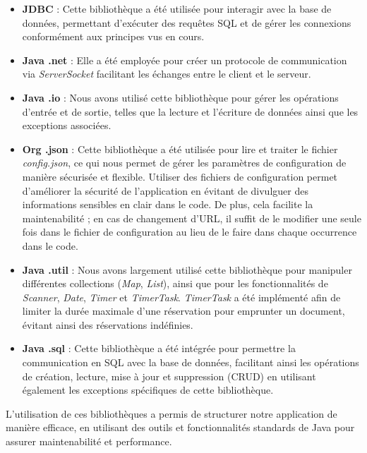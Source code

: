     \begin{itemize}
        \item \textbf{JDBC} : Cette bibliothèque a été utilisée pour interagir avec la base de données,
        permettant d'exécuter des requêtes SQL et de gérer les connexions conformément aux principes vus en cours.
        \bigskip
        \item \textbf{Java .net} : Elle a été employée pour créer un protocole de communication via \textit{ServerSocket}
        facilitant les échanges entre le client et le serveur.
        \bigskip
        \item \textbf{Java .io} : Nous avons utilisé cette bibliothèque pour gérer les opérations d'entrée et de sortie,
        telles que la lecture et l'écriture de données ainsi que les exceptions associées.
        \bigskip
        \item \textbf{Org .json} : Cette bibliothèque a été utilisée pour lire et traiter le fichier \textit{config.json},
        ce qui nous permet de gérer les paramètres de configuration de manière sécurisée et flexible.
        Utiliser des fichiers de configuration permet d’améliorer la sécurité de l’application en évitant de divulguer
        des informations sensibles en clair dans le code. De plus, cela facilite la maintenabilité ;
        en cas de changement d'URL, il suffit de le modifier une seule fois dans le fichier de configuration au lieu
        de le faire dans chaque occurrence dans le code.
        \bigskip
        \item \textbf{Java .util} : Nous avons largement utilisé cette bibliothèque pour manipuler différentes collections
        (\textit{Map}, \textit{List}), ainsi que pour les fonctionnalités de \textit{Scanner},
        \textit{Date}, \textit{Timer} et \textit{TimerTask}. \textit{TimerTask} a été implémenté afin de limiter
         la durée maximale d'une réservation pour emprunter un document, évitant ainsi des réservations indéfinies.
        \bigskip
        \item \textbf{Java .sql} : Cette bibliothèque a été intégrée pour permettre la communication en SQL avec la base
        de données, facilitant ainsi les opérations de création, lecture, mise à jour et suppression (CRUD) en
         utilisant également les exceptions spécifiques de cette bibliothèque.
    \end{itemize}

    \bigskip

    L'utilisation de ces bibliothèques a permis de structurer notre application de manière efficace,
    en utilisant des outils et fonctionnalités standards de Java pour assurer maintenabilité et performance.

    \clearpage

